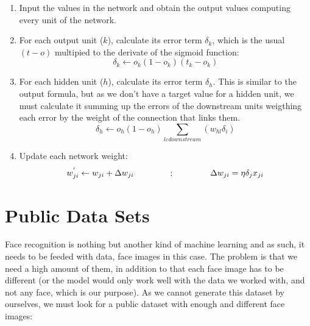 		\begin{enumerate}

			\item Input the values in the network and obtain the output values computing every unit of the network.
			\item For each output unit ($k$), calculate its error term $\delta_k$, which is the usual $(t-o)$ multipied to the derivate of the sigmoid function:
				\begin{equation}
					\label{backpropagation_output_error}
					\delta_k \leftarrow o_k (1 - o_k)(t_k - o_k)
				\end{equation}				

			\item For each hidden unit ($h$), calculate its error term $\delta_h$. This is similar to the output formula, but as we don't have a target value for a hidden unit, we must calculate it summing up the errors of the downstream units weigthing each error by the weight of the connection that links them. 
				\begin{equation}
					\label{backpropagation_hidden_error}
					\delta_h \leftarrow o_h (1 - o_h) \sum_{l \varepsilon downstream} (w_{hl} \delta_i)
				\end{equation}

			\item Update each network weight:
				\begin{equation}
					\label{backpropagation_weight_update}
					w^{'}_{ji} \leftarrow w_{ji} + \Delta w_{ji} \hspace{1.5cm} ; \hspace{1.5cm} \Delta w_{ji} = \eta \delta_j x_{ji}
				\end{equation}

		\end{enumerate} 



\section{Public Data Sets} 
Face recognition is nothing but another kind of machine learning and as such, it needs to be feeded with data, face images in this case. The problem is that we need a high amount of them, in addition to that each face image has to be different (or the model would only work well with the data we worked with, and not any face, which is our purpose). As we cannot generate this dataset by ourselves, we must look for a public dataset with enough and different face images:

